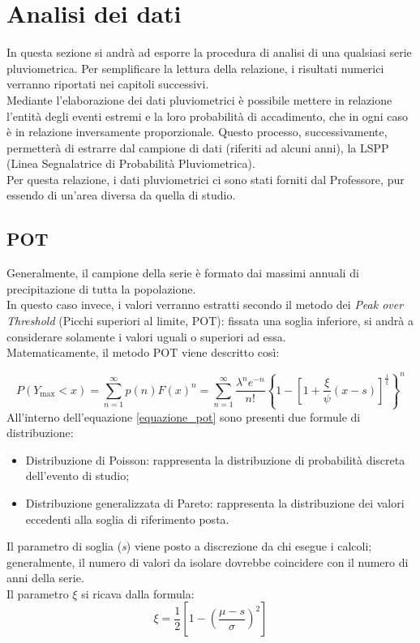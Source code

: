 \section{Analisi dei dati}
In questa sezione si andrà ad esporre la procedura di analisi di una qualsiasi serie pluviometrica. Per semplificare la lettura della relazione, i risultati numerici verranno riportati nei capitoli successivi.\\
Mediante l'elaborazione dei dati pluviometrici è possibile mettere in relazione l'entità degli eventi estremi e la loro probabilità di accadimento, che in ogni caso è in relazione inversamente proporzionale. Questo processo, successivamente, permetterà di estrarre dal campione di dati (riferiti ad alcuni anni), la LSPP (Linea Segnalatrice di Probabilità Pluviometrica).\\
Per questa relazione, i dati pluviometrici ci sono stati forniti dal Professore, pur essendo di un'area diversa da quella di studio.
\subsection{POT}
Generalmente, il campione della serie è formato dai massimi annuali di precipitazione di tutta la popolazione.\\
In questo caso invece, i valori verranno estratti secondo il metodo dei \textit{Peak over Threshold} (Picchi superiori al limite, POT): fissata una soglia inferiore, si andrà a considerare solamente i valori uguali o superiori ad essa.\\
Matematicamente, il metodo POT viene descritto così:

   \begin{equation} 
  P(Y_{\text{max}} < x) = \sum_{n=1}^{\infty} p(n) F(x)^n = \sum_{n=1}^{\infty} \frac{\lambda^n e^{-n}}{n!} \left\{ 1 - \left[ 1 + \frac{\xi}{\psi} (x - s) \right]^{\frac{1}{\xi}} \right\}^n
\label{equazione_pot}   
\end{equation}
All'interno dell'equazione \ref{equazione_pot} sono presenti due formule di distribuzione:
\begin{itemize}
    \item Distribuzione di Poisson: rappresenta la distribuzione di probabilità discreta dell'evento di studio;
    \item Distribuzione generalizzata di Pareto: rappresenta la distribuzione dei valori eccedenti alla soglia di riferimento posta.
\end{itemize}

Il parametro di soglia (\textit{s}) viene posto a discrezione da chi esegue i calcoli; generalmente, il numero di valori da isolare dovrebbe coincidere con il numero di anni della serie.\\
Il parametro $\xi$ si ricava dalla formula:
\begin{equation}
    \xi = \frac{1}{2} \left[1- \left( \frac{\mu - s}{\sigma} \right)^2 \right] 
\end{equation}

